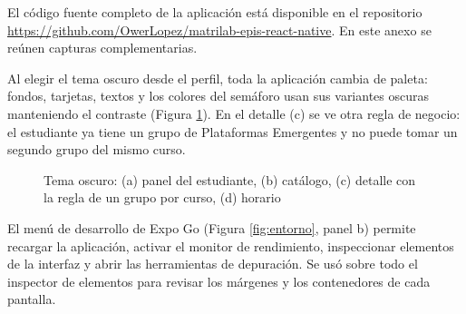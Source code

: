 \clearpage
{}

El código fuente completo de la aplicación está disponible en el repositorio \url{https://github.com/OwerLopez/matrilab-epis-react-native}. En este anexo se reúnen capturas complementarias.

\vspace{0.2cm}

Al elegir el tema oscuro desde el perfil, toda la aplicación cambia de paleta: fondos, tarjetas, textos y los colores del semáforo usan sus variantes oscuras manteniendo el contraste (Figura \ref{fig:oscuro}). En el detalle (c) se ve otra regla de negocio: el estudiante ya tiene un grupo de Plataformas Emergentes y no puede tomar un segundo grupo del mismo curso.

\begin{figure}[!htbp]
\centering
{}
\caption{Tema oscuro: (a) panel del estudiante, (b) catálogo, (c) detalle con la regla de un grupo por curso, (d) horario}
\label{fig:oscuro}
\end{figure}

\vspace{0.2cm}

El menú de desarrollo de Expo Go (Figura \ref{fig:entorno}, panel b) permite recargar la aplicación, activar el monitor de rendimiento, inspeccionar elementos de la interfaz y abrir las herramientas de depuración. Se usó sobre todo el inspector de elementos para revisar los márgenes y los contenedores de cada pantalla.

